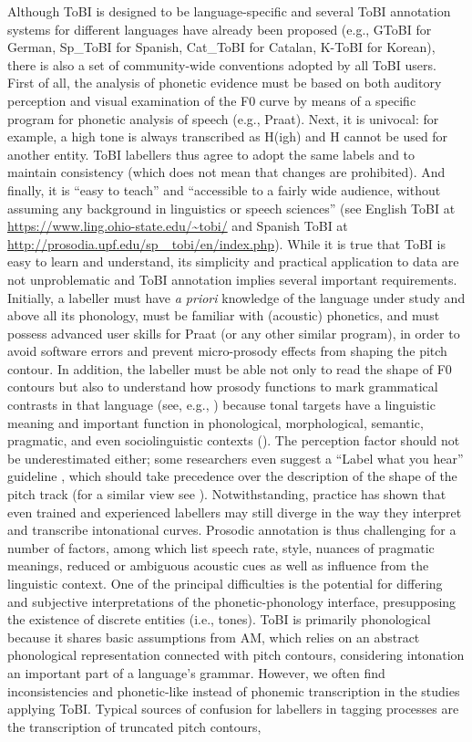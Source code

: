 Although ToBI is designed to be language-specific and several ToBI annotation systems for different languages have already been proposed (e.g., GToBI for German, Sp\_ToBI for Spanish, Cat\_ToBI for Catalan, K-ToBI for Korean), there is also a set of community-wide conventions adopted by all ToBI users. First of all, the analysis of phonetic evidence must be based on both auditory perception and visual examination of the F0 curve by means of a specific program for phonetic analysis of speech (e.g., Praat). Next, it is univocal: for example, a high tone is always transcribed as H(igh) and H cannot be used for another entity. ToBI labellers thus agree to adopt the same labels and to maintain consistency (which does not mean that changes are prohibited). And finally, it is “easy to teach” and “accessible to a fairly wide audience, without assuming any background in linguistics or speech sciences” (see English ToBI at \url{https://www.ling.ohio-state.edu/~tobi/} and Spanish ToBI at \url{http://prosodia.upf.edu/sp\_ tobi/en/index.php}). While it is true that ToBI is easy to learn and understand, its simplicity and practical application to data are not unproblematic and ToBI annotation implies several important requirements. Initially, a labeller must have \textit{a priori} knowledge of the language under study and above all its phonology, must be familiar with (acoustic) phonetics, and must possess advanced user skills for Praat (or any other similar program), in order to avoid software errors and prevent micro-prosody effects from shaping the pitch contour. In addition, the labeller must be able not only to read the shape of F0 contours but also to understand how prosody functions to mark grammatical contrasts in that language (see, e.g., \citealt{Arvaniti2016}) because tonal targets have a linguistic meaning and important function in phonological, morphological, semantic, pragmatic, and even sociolinguistic contexts (\citealt{JunFletcher2014}). The perception factor should not be underestimated either; some researchers even suggest a “Label what you hear” guideline \citep[28]{Wightman2002}, which should take precedence over the description of the shape of the pitch track (for a similar view see \citealt{Romportl2008}). Notwithstanding, practice has shown that even trained and experienced labellers may still diverge in the way they interpret and transcribe intonational curves. Prosodic annotation is thus challenging for a number of factors, among which \citet{ColeShattuck-Hufnagel2016} list speech rate, style, nuances of pragmatic meanings, reduced or ambiguous acoustic cues as well as influence from the linguistic context. One of the principal difficulties is the potential for differing and subjective interpretations of the phonetic-phonology interface, presupposing the existence of discrete entities (i.e., tones). ToBI is primarily phonological because it shares basic assumptions from AM, which relies on an abstract phonological representation connected with pitch contours, considering intonation an important part of a language’s grammar. However, we often find inconsistencies and phonetic-like instead of phonemic transcription in the studies applying ToBI. Typical sources of confusion for labellers in tagging processes are the transcription of truncated pitch contours, 
